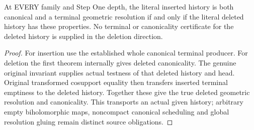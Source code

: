 \begin{theorem}
\label{hir:original-recursive-interior-empty-terminal-deletion-iff}
\leanok
At EVERY family and Step One depth, the literal inserted history is both
canonical and a terminal geometric resolution if and only if the literal
deleted history has these properties. No terminal or canonicality
certificate for the deleted history is supplied in the deletion direction.
\end{theorem}
\begin{proof}
For insertion use the established whole canonical terminal producer.
For deletion the first theorem internally gives deleted canonicality.
The genuine original invariant supplies actual testness of that deleted
history and head. Original transformed cosupport equality then transfers
inserted terminal emptiness to the deleted history. Together these give
the true deleted geometric resolution and canonicality. This transports
an actual given history; arbitrary empty biholomorphic maps, noncompact
canonical scheduling and global resolution gluing remain distinct source
obligations.
\end{proof}
